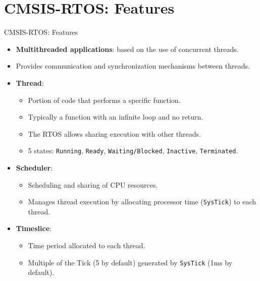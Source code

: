 \section{CMSIS-RTOS: Features}
\begin{frame}{CMSIS-RTOS: Features}
    \begin{itemize}
  \item \textbf{Multithreaded applications}: based on the use of concurrent threads.
  \item Provides communication and synchronization mechanisms between threads.
  \item \textbf{Thread}:
    \begin{itemize}
        \item Portion of code that performs a specific function.
        \item Typically a function with an infinite loop and no return.
        \item The RTOS allows sharing execution with other threads.
        \item 5 states: \texttt{Running}, \texttt{Ready}, \texttt{Waiting/Blocked}, \texttt{Inactive}, \texttt{Terminated}.
    \end{itemize}
  \item \textbf{Scheduler}:
    \begin{itemize}
        \item Scheduling and sharing of CPU resources.
        \item Manages thread execution by allocating processor time (\texttt{SysTick}) to each thread.
    \end{itemize}
  \item \textbf{Timeslice}:
    \begin{itemize}
        \item Time period allocated to each thread.
        \item Multiple of the Tick (5 by default) generated by \texttt{SysTick} (1ms by default).
    \end{itemize}
\end{itemize}

\end{frame}

